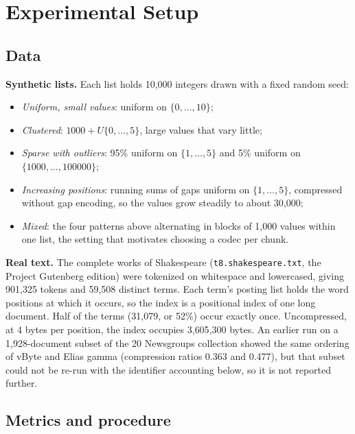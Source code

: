 \documentclass[11pt]{article}
\begin{document}
\section{Experimental Setup}

\subsection{Data}

\textbf{Synthetic lists.} Each list holds 10{,}000 integers drawn with a fixed random seed:
\begin{itemize}
  \item \emph{Uniform, small values}: uniform on $\{0,\dots,10\}$;
  \item \emph{Clustered}: $1000 + U\{0,\dots,5\}$, large values that vary little;
  \item \emph{Sparse with outliers}: 95\% uniform on $\{1,\dots,5\}$ and 5\% uniform on
        $\{1000,\dots,100000\}$;
  \item \emph{Increasing positions}: running sums of gaps uniform on $\{1,\dots,5\}$, compressed
        without gap encoding, so the values grow steadily to about 30{,}000;
  \item \emph{Mixed}: the four patterns above alternating in blocks of 1{,}000 values within one
        list, the setting that motivates choosing a codec per chunk.
\end{itemize}

\textbf{Real text.} The complete works of Shakespeare (\texttt{t8.shakespeare.txt}, the Project
Gutenberg edition) were tokenized on whitespace and lowercased, giving 901{,}325 tokens and 59{,}508
distinct terms. Each term's posting list holds the word positions at which it occurs, so the index
is a positional index of one long document. Half of the terms (31{,}079, or 52\%) occur exactly
once. Uncompressed, at 4 bytes per position, the index occupies 3{,}605{,}300 bytes. An earlier
run on a 1{,}928-document subset of the 20 Newsgroups collection showed the same ordering of vByte
and Elias gamma (compression ratios 0.363 and 0.477), but that subset could not be re-run with the
identifier accounting below, so it is not reported further.

\subsection{Metrics and procedure}
\end{document}
